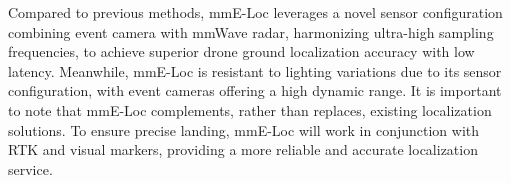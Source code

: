 {Compared to previous methods, mmE-Loc leverages a novel sensor configuration combining event camera with mmWave radar, harmonizing ultra-high sampling frequencies, to achieve superior drone ground localization accuracy with low latency.
Meanwhile, mmE-Loc is resistant to lighting variations due to its sensor configuration, with event cameras offering a high dynamic range. 
It is important to note that mmE-Loc complements, rather than replaces, existing localization solutions.
To ensure precise landing, mmE-Loc will work in conjunction with RTK and visual markers, providing a more reliable and accurate localization service.
}


